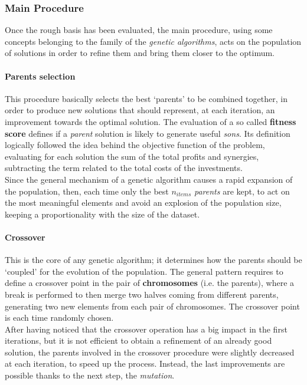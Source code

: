 \documentclass{article}
\begin{document}
\subsubsection{Main Procedure}
Once the rough basis has been evaluated, the main procedure, using some concepts belonging to the family of the \textit{genetic algorithms}, acts on the population of solutions in order to refine them and bring them closer to the optimum. 
\paragraph{Parents selection}
This procedure basically selects the best `parents' to be combined together, in order to produce new solutions that should represent, at each iteration, an improvement towards the optimal solution. The evaluation of a so called \textbf{fitness score} defines if a \emph{parent} solution is likely to generate useful \emph{sons}. Its definition logically followed the idea behind the objective function of the problem, evaluating for each solution the sum of the total profits and synergies, subtracting the term related to the total costs of the investments. \\

Since the general mechanism of a genetic algorithm causes a rapid expansion of the population, then, each time only the best $n_{items}$ \emph{parents} are kept, to act on the most meaningful elements and avoid an explosion of the population size, keeping a  proportionality with the size of the dataset. 
\paragraph{Crossover}
This is the core of any genetic algorithm; it determines how the parents should be `coupled' for the evolution of the population. The general pattern requires to define a crossover point in the pair of \textbf{chromosomes} (i.e. the parents), where a break is performed to then merge two halves coming from different parents, generating two new elements from each pair of chromosomes. The crossover point is each time randomly chosen. \\

After having noticed that the crossover operation has a big impact in the first iterations, but it is not efficient to obtain a refinement of an already good solution, the parents involved in the crossover procedure were slightly decreased at each iteration, to speed up the process. Instead, the last improvements are possible thanks to the next step, the \emph{mutation}.
\end{document}
